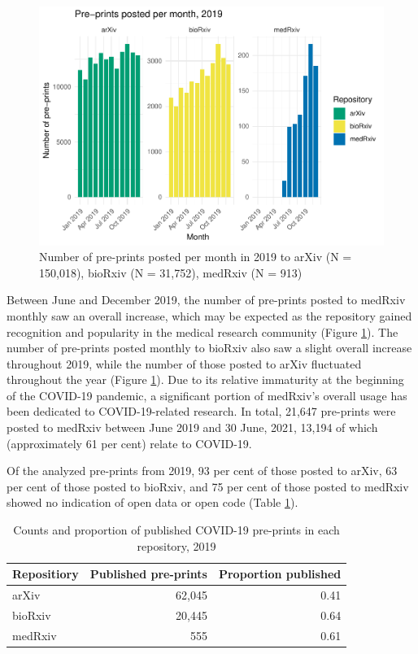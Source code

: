 \documentclass[
]{article}
\begin{document}
\begin{figure}[H]

{\centering \includegraphics[width=0.9\linewidth]{paper_files/figure-latex/2019-results-med-arxiv-1} 

}

\caption{Number of pre-prints posted per month in 2019 to arXiv (N = 150,018), bioRxiv (N = 31,752), medRxiv (N = 913)}\label{fig:2019-results-med-arxiv}
\end{figure}

Between June and December 2019, the number of pre-prints posted to medRxiv monthly saw an overall increase, which may be expected as the repository gained recognition and popularity in the medical research community (Figure \ref{fig:2019-results-med-arxiv}). The number of pre-prints posted monthly to bioRxiv also saw a slight overall increase throughout 2019, while the number of those posted to arXiv fluctuated throughout the year (Figure \ref{fig:2019-results-med-arxiv}). Due to its relative immaturity at the beginning of the COVID-19 pandemic, a significant portion of medRxiv's overall usage has been dedicated to COVID-19-related research. In total, 21,647 pre-prints were posted to medRxiv between June 2019 and 30 June, 2021, 13,194 of which (approximately 61 per cent) relate to COVID-19.

Of the analyzed pre-prints from 2019, 93 per cent of those posted to arXiv, 63 per cent of those posted to bioRxiv, and 75 per cent of those posted to medRxiv showed no indication of open data or open code (Table \ref{tab:2019-published}).

\begin{table}

\caption{\label{tab:2019-published}Counts and proportion of published COVID-19 pre-prints in each repository, 2019}
\centering
\begin{tabular}[t]{l|r|r}
\hline
Repositiory & Published pre-prints & Proportion published\\
\hline
arXiv & 62,045 & 0.41\\
\hline
bioRxiv & 20,445 & 0.64\\
\hline
medRxiv & 555 & 0.61\\
\hline
\end{tabular}
\end{table}
\end{document}
